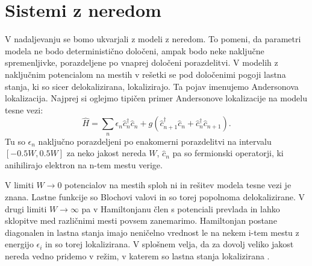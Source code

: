 \chapter{Sistemi z neredom}
V nadaljevanju se bomo ukvarjali z modeli z neredom. To pomeni, da parametri modela ne bodo deterministično določeni, ampak bodo neke naključne spremenljivke, porazdeljene po vnaprej določeni porazdelitvi.
V modelih z naključnim potencialom na mestih v rešetki se pod določenimi pogoji lastna stanja, ki so sicer delokalizirana, lokalizirajo. Ta pojav imenujemo Andersonova lokalizacija.
Najprej si oglejmo tipičen primer Andersonove lokalizacije na modelu tesne vezi:
\begin{equation}
\hat{H} = \sum_n \epsilon_n \hat{c}_n^\dagger \hat{c}_n + g\left( \hat{c}_{n+1}^\dagger \hat{c}_n + \hat{c}_n^\dagger \hat{c}_{n+1} \right).
\end{equation}
Tu so $\epsilon_n$ naključno porazdeljeni po enakomerni porazdelitvi na intervalu $[-0.5W,0.5W]$ za neko jakost nereda $W$, $\hat{c}_n$ pa so fermionski operatorji, ki anihilirajo elektron na n-tem mestu verige.

V limiti $W \to 0$ potencialov na mestih sploh ni in rešitev modela tesne vezi je znana. Lastne funkcije so Blochovi valovi in so torej popolnoma delokalizirane.
V drugi limiti $W \to \infty$ pa v Hamiltonjanu člen s potenciali prevlada in lahko sklopitve med različnimi mesti povsem zanemarimo. Hamiltonjan postane diagonalen in lastna stanja imajo neničelno vrednost le na nekem i-tem mestu z energijo $\epsilon_i$ in so torej lokalizirana. V splošnem velja, da za dovolj veliko jakost nereda vedno pridemo v režim, v katerem so lastna stanja lokalizirana \cite{anderson}.

